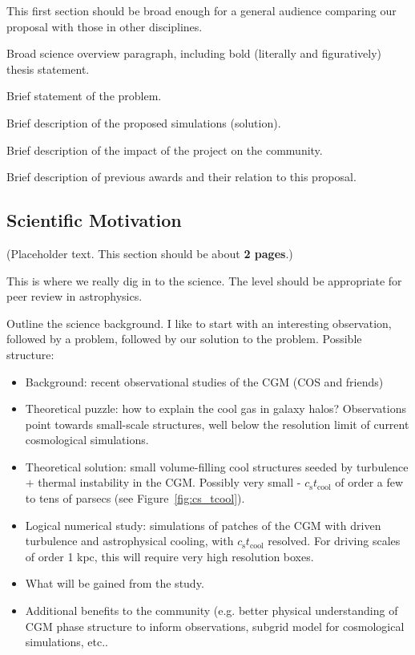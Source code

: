 \documentclass[11pt,letterpaper,english]{article}
\begin{document}
This first section should be broad enough for a general audience comparing our proposal with those in other disciplines.

Broad science overview paragraph, including bold (literally and figuratively) thesis statement.

Brief statement of the problem.

Brief description of the proposed simulations (solution).

Brief description of the impact of the project on the community.

Brief description of previous awards and their relation to this proposal.

\vspace{-.25in}
\subsection{Scientific Motivation}
\vspace{-.2in}

(Placeholder text. This section should be about {\bf 2 pages}.)

This is where we really dig in to the science. The level should be appropriate for peer review in astrophysics.

Outline the science background. I like to start with an interesting observation, followed by a problem, followed by our solution to the problem. Possible structure:
\begin{itemize}
\item{Background: recent observational studies of the CGM (COS and friends)}
\item{Theoretical puzzle: how to explain the cool gas in galaxy halos? Observations point towards small-scale structures, well below the resolution limit of current cosmological simulations.}
\item{Theoretical solution: small volume-filling cool structures seeded by turbulence + thermal instability in the CGM. Possibly very small - $c_\mathrm{s} t_\mathrm{cool}$ of order a few to tens of parsecs (see Figure~\ref{fig:cs_tcool}).}
\item{Logical numerical study: simulations of patches of the CGM with driven turbulence and astrophysical cooling, with $c_\mathrm{s} t_\mathrm{cool}$ resolved. For driving scales of order 1 kpc, this will require very high resolution boxes.}
\item{What will be gained from the study.}
\item{Additional benefits to the community (e.g. better physical understanding of CGM phase structure to inform observations, subgrid model for cosmological simulations, etc..}
\end{itemize}
\end{document}

